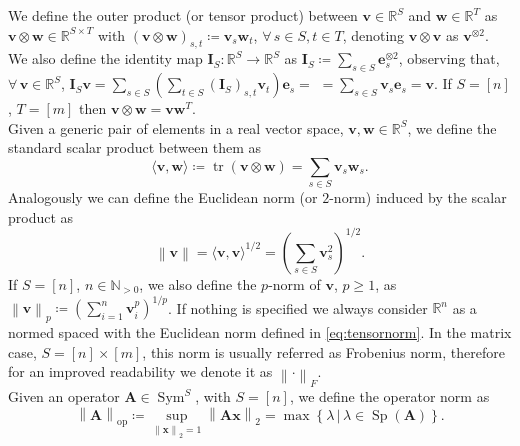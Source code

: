 \documentclass[a4paper, 11pt, reqno]{amsart}
\theoremstyle{plain}
\theoremstyle{remark}
\theoremstyle{definition}
\newcommand{\given}{\, | \,}
\newcommand{\real}{\mathbb{R}}
\renewcommand{\natural}{\mathbb{N}}
\newcommand{\norm}[1]{\left\lVert#1\right\rVert}
\newcommand{\trace}[1]{\operatorname{tr}\left(#1\right)}
\let\oldforall\forall
\renewcommand{\forall}{\oldforall\,}
\begin{document}
We define the outer product (or tensor product) between $\bm{v} \in \real^S$ and $\bm{w} \in \real^{T}$ as $\bm{v} \otimes \bm{w} \in \real^{S \times T}$ with $(\bm{v} \otimes \bm{w})_{s, t} \coloneqq \bm{v}_s \bm{w}_t$, $\forall s \in S, t \in T$, denoting $\bm{v} \otimes \bm{v}$ as $\bm{v}^{\otimes 2}$. 
We also define the identity map $\bm{I}_S: \real^S \to \real^S$ as $\bm{I}_S \coloneqq \sum_{s \in S} \bm{e}_s^{\otimes 2}$, observing that, $\forall \bm{v} \in \real^S$, $\bm{I}_S \bm{v} = \sum_{s \in S} (\sum_{t \in S} (\bm{I}_S)_{s, t} \bm{v}_t) \bm{e}_s =$ $= \sum_{s \in S} \bm{v}_s \bm{e}_s = \bm{v}$.
If $S = [n]$, $T = [m]$ then $\bm{v} \otimes \bm{w} = \bm{v} \bm{w}^T$. \\
Given a generic pair of elements in a real vector space, $\bm{v}, \bm{w} \in \real^S$, we define the standard scalar product between them as 
\begin{equation*}
	\langle \bm{v}, \bm{w} \rangle \coloneqq \trace{\bm{v} \otimes \bm{w}} = \sum_{s \in S} \bm{v}_s \bm{w}_s.
\end{equation*}
Analogously we can define the Euclidean norm (or $2$-norm) induced by the scalar product as
\begin{equation} \label{eq:tensornorm}
	\norm{\bm{v}} = \langle \bm{v}, \bm{v} \rangle^{1/2} = \left(\sum_{s \in S} \bm{v}_s^2\right)^{1/2}.
\end{equation}
If $S = [n]$, $n \in \natural_{> 0}$, we also define the $p$-norm of $\bm{v}$, $p \geq 1$, as $\norm{\bm{v}}_p \coloneqq \left(\sum_{i = 1}^{n} \bm{v}_i^p\right)^{1/p}$. 
If nothing is specified we always consider $\real^n$ as a normed spaced with the Euclidean norm defined in \cref{eq:tensornorm}. 
In the matrix case, $S = [n] \times [m]$, this norm is usually referred as Frobenius norm, therefore for an improved readability we denote it as $\norm{\cdot}_F$. \\
Given an operator $\bm{A} \in \operatorname{Sym}^{S}$, with $S = [n]$, we define the operator norm as
\begin{equation*}
	\norm{\bm{A}}_{\mathrm{op}} \coloneqq \sup_{\norm{\bm{x}}_2 = 1} \norm{\bm{A}\bm{x}}_2 = \max\left\{\lambda \given \lambda \in \operatorname{Sp}(\bm{A})\right\}.
\end{equation*}
\end{document}

